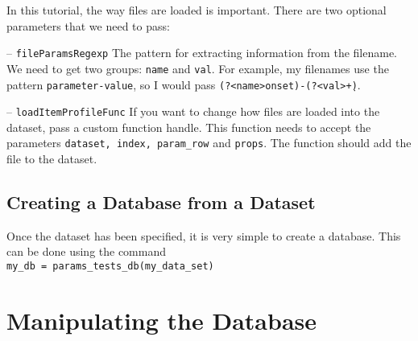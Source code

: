 \documentclass{article}
\let\oldmarginpar\marginpar
\renewcommand\marginpar[1]{\-\oldmarginpar[\raggedleft #1]%
{\raggedright #1}}
\newenvironment{checklist}{%
  \begin{list}{}{}%
  \let\olditem\item
  \renewcommand\item{\olditem -- \marginpar{$\Box$} }
  \newcommand\checkeditem{\olditem -- \marginpar{$\CheckedBox$} }
}{%
  \end{list}
}
\begin{document}
In this tutorial, the way files are loaded is important. There are two optional parameters that we need to pass:

\begin{checklist}
	\item		\texttt{fileParamsRegexp} The pattern for extracting information from the filename. We need to get two groups: \texttt{name} and \texttt{val}. For example, my filenames use the pattern \texttt{parameter-value}, so I would pass \texttt{(?<name>onset)-(?<val>\d+)}.
	\item		\texttt{loadItemProfileFunc} If you want to change how files are loaded into the dataset, pass a custom function handle. This function needs to accept the parameters \texttt{dataset, index, param\_row} and \texttt{props}. The function should add the file to the dataset.
\end{checklist}

\subsection{Creating a Database from a Dataset}

Once the dataset has been specified, it is very simple to create a database. This can be done using the command\\

\texttt{my\_db = params\_tests\_db(my\_data\_set)}

\section{Manipulating the Database}
\end{document}
